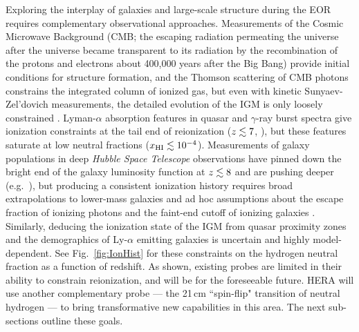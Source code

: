 \documentclass[preprint,11pt]{aastex}
\begin{document}
Exploring the interplay of galaxies and large-scale structure during the EOR
requires complementary observational approaches. Measurements of the Cosmic Microwave Background (CMB; the escaping radiation permeating the universe after the universe became
transparent to its radiation by the recombination of the protons and electrons about 400,000 years after the Big Bang)  provide initial conditions for structure formation, and the Thomson
scattering of CMB photons constrains the integrated column of 
ionized gas, but even with kinetic Sunyaev-Zel'dovich measurements, 
the detailed evolution of the IGM 
is only loosely constrained \citep{haiman_holder2003,mortonson_hu2008,zahn_etal2012,mesinger_et_al2012}.
Lyman-$\alpha$ absorption features in quasar and $\gamma$-ray burst spectra give 
ionization constraints at the tail end of reionization 
($z\lesssim7$, \citealt{fan_et_al2006, mcgreer_et_al2015}), but these features 
saturate at low neutral fractions
($x_{\rm HI} \lesssim 10^{-4}$). Measurements of galaxy populations in
deep {\it Hubble Space Telescope} observations 
have pinned down the bright end of the galaxy luminosity function at $z \lesssim 8$
\citep{schenker_et_al2013, bouwens_et_al2015} and are pushing deeper
(e.g.~\citealt{mcleod_et_al2015}), but producing a consistent ionization history
requires broad extrapolations to
lower-mass galaxies and ad hoc assumptions about the escape fraction of
ionizing photons and the faint-end cutoff of ionizing galaxies
\citep{robertson_et_al2015, bouwens_et_al2015_reion}. 
Similarly, deducing the ionization state of the IGM from quasar proximity zones
\citep{carilli_et_al2010, bolton_et_al2011, bosman_becker2015} and the
demographics of Ly-$\alpha$ emitting galaxies \citep{fontana_et_al2010,
schenker_et_al2012, treu_et_al2012, dijkstra_et_al2014} is uncertain and
highly model-dependent.  See Fig.~\ref{fig:IonHist} for these constraints on the hydrogen neutral fraction as a function of redshift.
As shown, existing probes are limited in
their ability to constrain reionization, and will be for the foreseeable future.
HERA will use
another complementary probe --- the 21\,cm ``spin-flip" transition of neutral hydrogen
--- to bring transformative new capabilities in this area.  The next sub-sections outline these goals.
\end{document}
